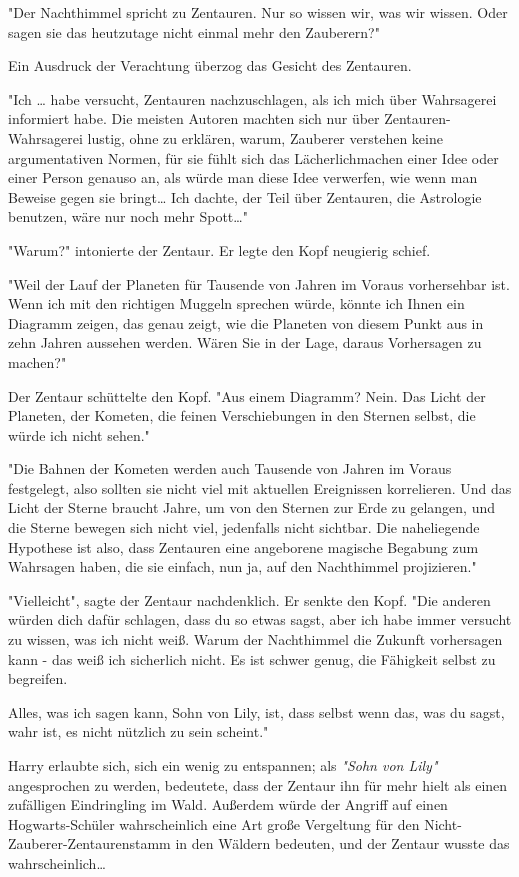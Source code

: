 {"Der Nachthimmel spricht zu Zentauren. Nur so wissen wir, was wir wissen. Oder sagen sie das heutzutage nicht einmal mehr den Zauberern?"

Ein Ausdruck der Verachtung überzog das Gesicht des Zentauren.

"Ich … habe versucht, Zentauren nachzuschlagen, als ich mich über Wahrsagerei informiert habe. Die meisten Autoren machten sich nur über Zentauren-Wahrsagerei lustig, ohne zu erklären, warum, Zauberer verstehen keine argumentativen Normen, für sie fühlt sich das Lächerlichmachen einer Idee oder einer Person genauso an, als würde man diese Idee verwerfen, wie wenn man Beweise gegen sie bringt… Ich dachte, der Teil über Zentauren, die Astrologie benutzen, wäre nur noch mehr Spott…"

"Warum?" intonierte der Zentaur. Er legte den Kopf neugierig schief.

"Weil der Lauf der Planeten für Tausende von Jahren im Voraus vorhersehbar ist. Wenn ich mit den richtigen Muggeln sprechen würde, könnte ich Ihnen ein Diagramm zeigen, das genau zeigt, wie die Planeten von diesem Punkt aus in zehn Jahren aussehen werden. Wären Sie in der Lage, daraus Vorhersagen zu machen?"

Der Zentaur schüttelte den Kopf. "Aus einem Diagramm? Nein. Das Licht der Planeten, der Kometen, die feinen Verschiebungen in den Sternen selbst, die würde ich nicht sehen."

"Die Bahnen der Kometen werden auch Tausende von Jahren im Voraus festgelegt, also sollten sie nicht viel mit aktuellen Ereignissen korrelieren. Und das Licht der Sterne braucht Jahre, um von den Sternen zur Erde zu gelangen, und die Sterne bewegen sich nicht viel, jedenfalls nicht sichtbar. Die naheliegende Hypothese ist also, dass Zentauren eine angeborene magische Begabung zum Wahrsagen haben, die sie einfach, nun ja, auf den Nachthimmel projizieren."

"Vielleicht", sagte der Zentaur nachdenklich. Er senkte den Kopf. "Die anderen würden dich dafür schlagen, dass du so etwas sagst, aber ich habe immer versucht zu wissen, was ich nicht weiß. Warum der Nachthimmel die Zukunft vorhersagen kann - das weiß ich sicherlich nicht. Es ist schwer genug, die Fähigkeit selbst zu begreifen.

Alles, was ich sagen kann, Sohn von Lily, ist, dass selbst wenn das, was du sagst, wahr ist, es nicht nützlich zu sein scheint."

Harry erlaubte sich, sich ein wenig zu entspannen; als \emph{"Sohn von Lily"} angesprochen zu werden, bedeutete, dass der Zentaur ihn für mehr hielt als einen zufälligen Eindringling im Wald. Außerdem würde der Angriff auf einen Hogwarts-Schüler wahrscheinlich eine Art große Vergeltung für den Nicht-Zauberer-Zentaurenstamm in den Wäldern bedeuten, und der Zentaur wusste das wahrscheinlich…

}
